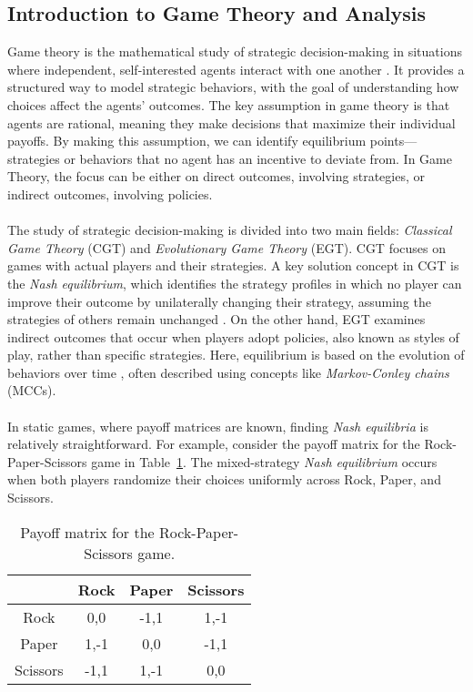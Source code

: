\subsection{Introduction to Game Theory and Analysis}

\begin{flushleft}

    Game theory is the mathematical study of strategic decision-making in situations where independent, self-interested agents interact with one another \cite{Shoham_Leyton-Brown_2008}. It provides a structured way to model strategic behaviors, with the goal of understanding how choices affect the agents' outcomes. The key assumption in game theory is that agents are rational, meaning they make decisions that maximize their individual payoffs. By making this assumption, we can identify equilibrium points—strategies or behaviors that no agent has an incentive to deviate from. In Game Theory, the focus can be either on direct outcomes, involving strategies, or indirect outcomes, involving policies.\\~\\

    The study of strategic decision-making is divided into two main fields: \emph{Classical Game Theory} (CGT) and \emph{Evolutionary Game Theory} (EGT). CGT focuses on games with actual players and their strategies. A key solution concept in CGT is the \emph{Nash equilibrium}, which identifies the strategy profiles in which no player can improve their outcome by unilaterally changing their strategy, assuming the strategies of others remain unchanged \cite{doi:10.1073/pnas.36.1.48}. On the other hand, EGT examines indirect outcomes that occur when players adopt policies, also known as styles of play, rather than specific strategies. Here, equilibrium is based on the evolution of behaviors over time \cite{Szab__2007}, often described using concepts like \emph{Markov-Conley chains} (MCCs).\\~\\

    In static games, where payoff matrices are known, finding \emph{Nash equilibria} is relatively straightforward. For example, consider the payoff matrix for the Rock-Paper-Scissors game in Table~\ref{tab:rps_payoff}. The mixed-strategy \emph{Nash equilibrium} occurs when both players randomize their choices uniformly across Rock, Paper, and Scissors.
    \begin{table}[H]
        \centering
        \caption{Payoff matrix for the Rock-Paper-Scissors game.}
        \label{tab:rps_payoff}
        \vspace{0.5em}
        \begin{tabular}{c|c c c}
            & Rock & Paper & Scissors \\ \hline
            Rock     & 0,0    & -1,1   & 1,-1 \\
            Paper    & 1,-1   & 0,0    & -1,1 \\
            Scissors & -1,1   & 1,-1   & 0,0 \\
        \end{tabular}
    \end{table}
    

\end{flushleft}
